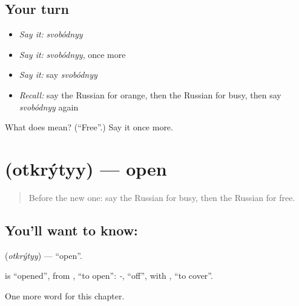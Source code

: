 \subsection*{Your turn}
\begin{itemize}
\raggedright
  \item \emph{Say it:} \emph{svobódnyy}
  \item \emph{Say it:} \emph{svobódnyy}, once more
  \item \emph{Say it:} say \emph{svobódnyy}
  \item \emph{Recall:} say the Russian for orange, then the Russian for busy, then say \emph{svobódnyy} again
\end{itemize}

\begin{tcolorbox}[breakable,colback=teal!4,colframe=teal!35!black,title={Before you move on}]
What does  mean? (\textquotedblleft{}Free\textquotedblright{}.) Say it once more.
\end{tcolorbox}
\section[\texorpdfstring{\ru{открытый} (otkrýtyy)}{открытый (otkrýtyy)}]{ (otkrýtyy) — open}

\label{lesson:RU-C125-open}



\begin{quote}
Before the new one: say the Russian for busy, then the Russian for free.
\end{quote}

\subsection*{You'll want to know: }
\textbf{} (\emph{otkrýtyy}) — \textquotedblleft{}open\textquotedblright{}.

\begin{cousinweb}
\textbf{} is \textquotedblleft{}opened\textquotedblright{}, from \emph{}, \textquotedblleft{}to open\textquotedblright{}: \emph{-}, \textquotedblleft{}off\textquotedblright{}, with \emph{}, \textquotedblleft{}to cover\textquotedblright{}.
\end{cousinweb}

\begin{grammarlens}[title={What you've built}]
One more word for this chapter.
\end{grammarlens}

